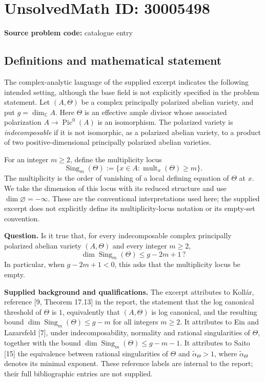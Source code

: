\documentclass[11pt]{article}
\newcommand{\C}{\mathbb{C}}
\begin{document}
\section*{UnsolvedMath ID: 30005498}
\textbf{Source problem code:} catalogue entry
\subsection{Definitions and mathematical statement}
The complex-analytic language of the supplied excerpt indicates the following intended setting, although the base field is not explicitly specified in the problem statement. Let \((A,\Theta)\) be a complex principally polarized abelian variety, and put \(g=\dim_{\C}A\). Here \(\Theta\) is an effective ample divisor whose associated polarization \(A\to\operatorname{Pic}^{0}(A)\) is an isomorphism. The polarized variety is \emph{indecomposable} if it is not isomorphic, as a polarized abelian variety, to a product of two positive-dimensional principally polarized abelian varieties.

For an integer \(m\geq2\), define the multiplicity locus
\[
\operatorname{Sing}_{m}(\Theta)
 :=\{x\in A:\operatorname{mult}_{x}(\Theta)\geq m\}.
\]
The multiplicity is the order of vanishing of a local defining equation of \(\Theta\) at \(x\). We take the dimension of this locus with its reduced structure and use \(\dim\varnothing=-\infty\). These are the conventional interpretations used here; the supplied excerpt does not explicitly define its multiplicity-locus notation or its empty-set convention.

\textbf{Question.} Is it true that, for every indecomposable complex principally polarized abelian variety \((A,\Theta)\) and every integer \(m\geq2\),
\[
\dim\operatorname{Sing}_{m}(\Theta)\leq g-2m+1\,?
\]
In particular, when \(g-2m+1<0\), this asks that the multiplicity locus be empty.

\textbf{Supplied background and qualifications.} The excerpt attributes to Koll\'ar, reference [9, Theorem 17.13] in the report, the statement that the log canonical threshold of \(\Theta\) is \(1\), equivalently that \((A,\Theta)\) is log canonical, and the resulting bound \(\dim\operatorname{Sing}_{m}(\Theta)\leq g-m\) for all integers \(m\geq2\). It attributes to Ein and Lazarsfeld [7], under indecomposability, normality and rational singularities of \(\Theta\), together with the bound \(\dim\operatorname{Sing}_{m}(\Theta)\leq g-m-1\). It attributes to Saito [15] the equivalence between rational singularities of \(\Theta\) and \(\widetilde\alpha_{\Theta}>1\), where \(\widetilde\alpha_{\Theta}\) denotes its minimal exponent. These reference labels are internal to the report; their full bibliographic entries are not supplied.
\end{document}
